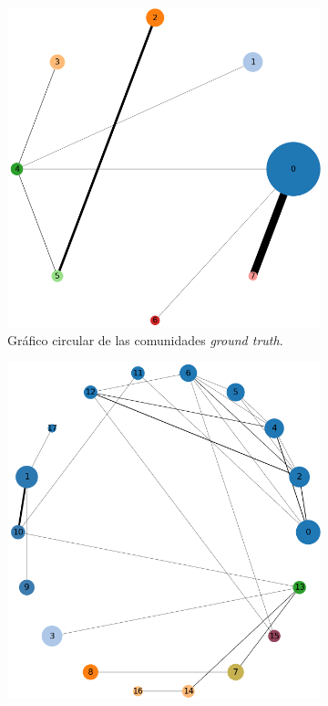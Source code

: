 \begin{figure}[!htb]
  \centering
  \begin{subfigure}{.4\textwidth}
    \centering
    \includegraphics[width=.9\linewidth]{img/1_circular_comp_1}
    \caption{Gráfico circular de las comunidades \emph{ground truth}. }
    \label{fig:1-circular-comp-1}
  \end{subfigure}%
  \hfill
  \begin{subfigure}{.4\textwidth}
    \centering
    \includegraphics[width=.9\linewidth]{img/1_circular_comp_2}

\end{subfigure}
\end{figure}
